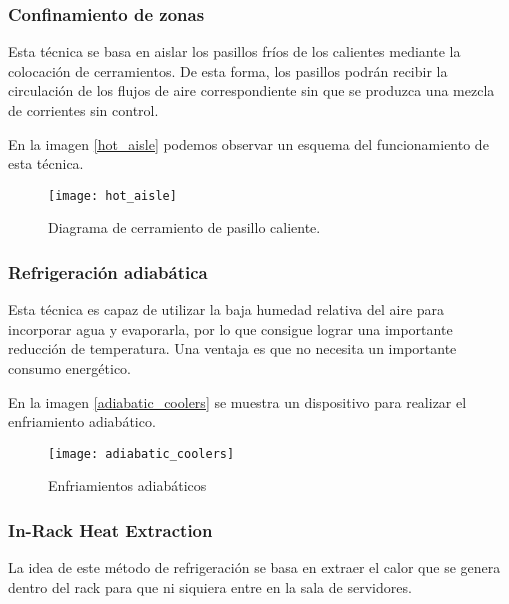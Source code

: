 \subsubsection{Confinamiento de zonas}

Esta técnica se basa en aislar los pasillos fríos de los calientes mediante la colocación de cerramientos. De esta forma, los pasillos podrán recibir la circulación de los flujos de aire correspondiente sin que se produzca una mezcla de corrientes sin control.

En la imagen \eqref{hot_aisle} podemos observar un esquema del funcionamiento de esta técnica.

\begin{figure}
    \begin{center}
        \texttt{[image: hot\_aisle]}
        \caption{Diagrama de cerramiento de pasillo caliente.}
        \label{hot_aisle}
    \end{center}
\end{figure}

\subsubsection{Refrigeración adiabática}

Esta técnica es capaz de utilizar la baja humedad relativa del aire para incorporar agua y evaporarla, por lo que consigue lograr una importante reducción de temperatura. Una ventaja es que no necesita un importante consumo energético.

En la imagen \eqref{adiabatic_coolers} se muestra un dispositivo para realizar el enfriamiento adiabático.

\begin{figure}
    \begin{center}
        \texttt{[image: adiabatic\_coolers]}
        \caption{Enfriamientos adiabáticos}
        \label{adiabatic_coolers}
    \end{center}
\end{figure}

\subsubsection{In-Rack Heat Extraction}

La idea de este método de refrigeración se basa en extraer el calor que se genera dentro del rack para que ni siquiera entre en la sala de servidores.

